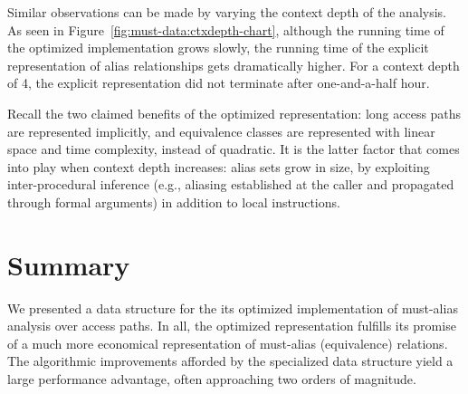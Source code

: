 Similar observations can be made by varying the context depth of the analysis. As seen in Figure~\ref{fig:must-data:ctxdepth-chart}, although the running time of the optimized implementation grows slowly, the running time of the explicit representation of alias relationships gets dramatically higher. For a context depth of 4, the explicit representation did not terminate after one-and-a-half hour.

Recall the two claimed benefits of the optimized representation: long access paths are represented implicitly, and equivalence classes are represented with linear space and time complexity, instead of quadratic. It is the latter factor that comes into play when context depth increases: alias sets grow in size, by exploiting inter-procedural inference (e.g., aliasing established at the caller and propagated through formal arguments) in addition to local instructions.


\section{Summary}

We presented a data structure for the its optimized implementation of must-alias analysis over access paths. In all, the optimized representation fulfills its promise of a much more economical representation of must-alias (equivalence) relations. The algorithmic improvements afforded by the specialized data structure yield a large performance advantage, often approaching two orders of magnitude.